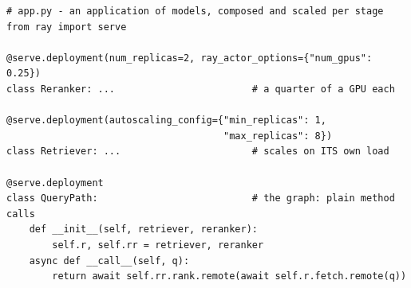 \begin{terminalbox}
\begin{Verbatim}[breaklines=true,breakanywhere=true,fontsize=\small,formatcom=\color{tbbtermfg},codes=\tbbcodeactive]
# app.py - an application of models, composed and scaled per stage
from ray import serve

@serve.deployment(num_replicas=2, ray_actor_options={"num_gpus": 0.25})
class Reranker: ...                        # a quarter of a GPU each

@serve.deployment(autoscaling_config={"min_replicas": 1,
                                      "max_replicas": 8})
class Retriever: ...                       # scales on ITS own load

@serve.deployment
class QueryPath:                           # the graph: plain method calls
    def __init__(self, retriever, reranker):
        self.r, self.rr = retriever, reranker
    async def __call__(self, q):
        return await self.rr.rank.remote(await self.r.fetch.remote(q))
\end{Verbatim}
\end{terminalbox}

